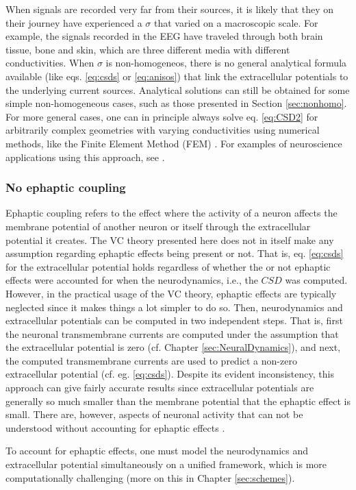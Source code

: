 When signals are recorded very far from their sources, it is likely that they on their journey have experienced a $\sigma$ that varied on a macroscopic scale. For example, the signals recorded in the EEG have traveled through both brain tissue, bone and skin, which are three different media with different conductivities. When $\sigma$ is non-homogeneos, there is no general analytical formula available (like eqs. \ref{eq:csds} or \ref{eq:anisos}) that link the extracellular potentials to the underlying current sources. Analytical solutions can still be obtained for some simple non-homogeneous cases, such as those presented in Section \ref{sec:nonhomo}. For more general cases, one can in principle always solve eq. \ref{eq:CSD2} for arbitrarily complex geometries with varying conductivities using numerical methods, like the Finite Element Method (FEM) \citep{Logg2012}. For examples of neuroscience applications using this approach, see \cite{Moffitt2005, Frey2009, Joucla2012, Haufe2015, Ness2015, Buccino2019b, Obien2019}. 





\subsubsection{No ephaptic coupling} 
Ephaptic coupling refers to the effect where the activity of a neuron affects the membrane potential of another neuron or itself through the extracellular potential it creates. The VC theory presented here does not in itself make any assumption regarding ephaptic effects being present or not. That is, eq. \ref{eq:csds} for the extracellular potential holds regardless of whether the or not ephaptic effects were accounted for when the neurodynamics, i.e., the $CSD$ was computed. However, in the practical usage of the VC theory, ephaptic effects are typically neglected since it makes things a lot simpler to do so. Then, neurodynamics and extracellular potentials can be computed in two independent steps. That is, first the neuronal transmembrane currents are computed under the assumption that the extracellular potential is zero (cf. Chapter \ref{sec:NeuralDynamics}), and next, the computed transmembrane currents are used to predict a non-zero extracellular potential (cf. eg. \ref{eq:csds}). Despite its evident inconsistency, this approach can give fairly accurate results since extracellular potentials are generally so much smaller than the membrane potential that the ephaptic effect is small. There are, however, aspects of neuronal activity that can not be understood without accounting for ephaptic effects \cite{Holt1999, Anastassiou2015, Goldwyn2016}. 

To account for ephaptic effects, one must model the neurodynamics and extracellular potential simultaneously on a unified framework, which is more computationally challenging (more on this in Chapter \ref{sec:schemes}).



